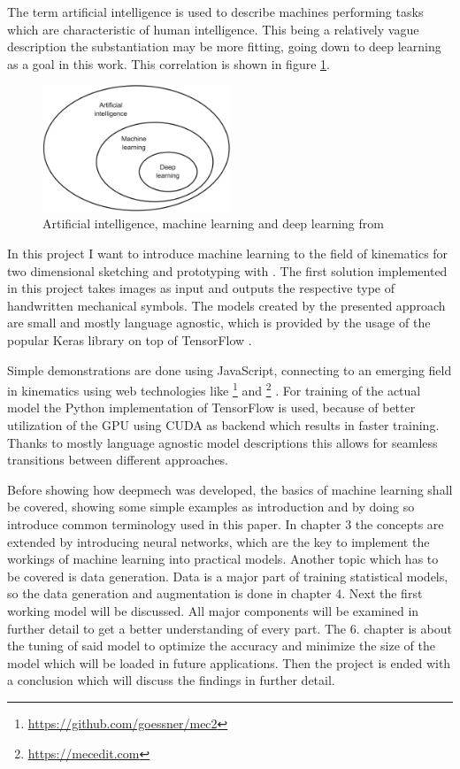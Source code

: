 The term artificial intelligence is used to describe machines performing tasks which are characteristic of human intelligence.
This being a relatively vague description the substantiation may be more fitting, going down to deep learning as a goal in this work.
This correlation is shown in figure \ref{fig:ai_ml_dl}.

\begin{figure}
    \includegraphics[width=0.5\textwidth]{images/ai_ml_dl.png}
    \caption{Artificial intelligence, machine learning and deep learning from \cite[p.4]{Chollet2017}}
    \label{fig:ai_ml_dl}
\end{figure}

In this project I want to introduce machine learning to the field of kinematics for two dimensional sketching and prototyping with .
The first solution implemented in this project takes images as input and outputs the respective type of handwritten mechanical symbols.
The models created by the presented approach are small and mostly language agnostic, which is provided by the usage of the popular Keras \cite{Chollet} library on top of TensorFlow \cite{Google}.

Simple demonstrations are done using JavaScript, connecting to an emerging field in kinematics using web technologies like \footnote{\url{https://github.com/goessner/mec2}} \cite{Goessner2019} and \footnote{\url{https://mecedit.com}} \cite{Uhlig2019}.
For training of the actual model the Python implementation of TensorFlow is used, because of better utilization of the GPU using CUDA \cite{nvidia2019} as backend which results in faster training.
Thanks to mostly language agnostic model descriptions this allows for seamless transitions between different approaches.

Before showing how deepmech was developed, the basics of machine learning shall be covered, showing some simple examples as introduction and by doing so introduce common terminology used in this paper.
In chapter 3 the concepts are extended by introducing neural networks, which are the key to implement the workings of machine learning into practical models.
Another topic which has to be covered is data generation. Data is a major part of training statistical models, so the data generation and augmentation is done in chapter 4.
Next the first working model will be discussed.
All major components will be examined in further detail to get a better understanding of every part.
The 6. chapter is about the tuning of said model to optimize the accuracy and minimize the size of the model which will be loaded in future applications.
Then the project is ended with a conclusion which will discuss the findings in further detail.
